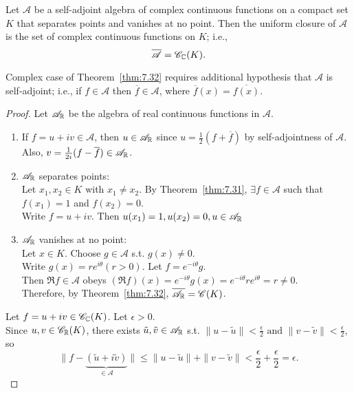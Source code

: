 \begin{thm}
	Let $\mathscr{A}$ be a self-adjoint algebra of complex continuous functions on a compact set $K$ that separates points and vanishes at no point. Then the uniform closure of $\mathscr{A}$ is the set of complex continuous functions on $K$; i.e.,\[
		\overline{\mathscr{A}}=\mathscr{C}_{\mathbb{C}}(K)
	.\] 
	\begin{note}
	Complex case of Theorem~\ref{thm:7.32} requires additional hypothesis that $\mathscr{A}$ is self-adjoint; i.e., if $f \in \mathscr{A}$ then $\overline{f}  \in \mathscr{A}$, where $\overline{f}(x) = \overline{f(x)}$.
	\end{note}
	\begin{proof}
		Let $\mathscr{A}_{\mathbb{R}}$ be the algebra of real continuous functions in $\mathscr{A}$.
		\begin{enumerate}[label=(\roman*)]
			\item If $f=u+iv \in \mathscr{A}$, then $u \in \mathscr{A}_{\mathbb{R}}$ since $u=\frac{1}{2}(f+\overline{f})$ by self-adjointness of $\mathscr{A}$.
				Also, $v=\frac{1}{2i}(f-\overline{f}) \in \mathscr{A}_{\mathbb{R}}$.
			\item $\mathscr{A}_{\mathbb{R}}$ separates points:\\
				Let $x_{1},x_{2} \in K$ with $x_{1}\neq x_{2}$. 
				By Theorem~\ref{thm:7.31}, $\exists{f \in \mathscr{A}}$ such that $f(x_{1})=1$ and $f(x_{2})=0$.\\
				Write $f=u+iv$. Then $u(x_{1})=1,u(x_{2})=0,u \in \mathscr{A}_{\mathbb{R}}$
			\item $\mathscr{A}_{\mathbb{R}}$ vanishes at no point:\\
				Let $x \in K$. Choose $g \in \mathscr{A}$ s.t. $g(x)\neq 0$.\\
				Write $g(x)=re^{i\theta}(r>0)$. Let $f=e^{-i \theta}g$.\\
				Then $\Re{f} \in \mathscr{A}$ obeys $(\Re{f})(x)=e^{-i \theta}g(x)=e^{-i \theta}r e^{i \theta}=r \neq 0$.\\
		Therefore, by Theorem~\ref{thm:7.32}, $\overline{\mathscr{A}_{\mathbb{R}}}=\mathscr{C}(K)$.
		\end{enumerate}
		Let $f= u+iv \in \mathscr{C}_{\mathbb{C}}(K)$. Let $\epsilon>0$.\\
		Since $u,v \in \mathscr{C}_{\mathbb{R}}(K)$, there exists $\tilde{u},\tilde{v} \in \mathscr{A}_{\mathbb{R}}$ s.t. $\|u-\tilde{u}\|<\frac{\epsilon}{2} \text{ and } \|v-\tilde{v}\|<\frac{\epsilon}{2}$, so \[
			\|f-\underbrace{(\tilde{u}+i\tilde{v})}_{\in \mathscr{A}}\|\le \|u-\tilde{u}\|+\|v-\tilde{v}\|<\frac{\epsilon}{2}+\frac{\epsilon}{2}=\epsilon
		.\] 
	\end{proof}
\end{thm}
